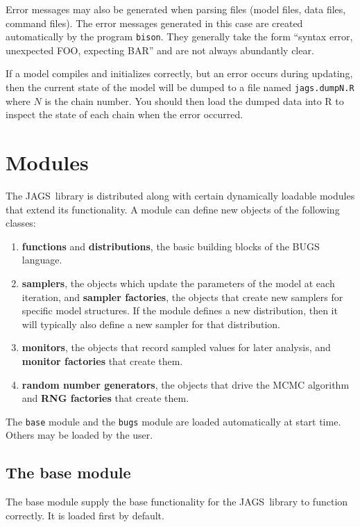 \documentclass[11pt, a4paper, titlepage]{report}
\newcommand{\JAGS}{\textsf{JAGS}}
\begin{document}
Error messages may also be generated when parsing files (model files,
data files, command files).  The error messages generated in this case
are created automatically by the program \texttt{bison}. They
generally take the form ``syntax error, unexpected FOO, expecting BAR''
and are not always abundantly clear.

If a model compiles and initializes correctly, but an error occurs
during updating, then the current state of the model will be dumped
to a file named \verb+jags.dumpN.R+ where $N$ is the chain number.
You should then load the dumped data into R to inspect the state of
each chain when the error occurred.

\chapter{Modules}
\label{section:modules}

The \JAGS\  library is distributed along with certain dynamically
loadable modules that extend its functionality. A module can define
new objects of the following classes:
\begin{enumerate}
\item {\bf functions} and {\bf distributions}, the basic building
blocks of the BUGS language.
\item {\bf samplers}, the objects which update the parameters of the
model at each iteration, and {\bf sampler factories}, the objects that 
create new samplers for specific model structures.  If the module
defines a new distribution, then it will typically also define a new
sampler for that distribution.
\item {\bf monitors}, the objects that record sampled values for
later analysis, and {\bf monitor factories} that create them. 
\item {\bf random number generators}, the objects that drive the
MCMC algorithm and {\bf RNG factories} that create them.
\end{enumerate}

The \verb+base+ module and the \verb+bugs+ module are loaded automatically
at start time.  Others may be loaded by the user.

\section{The base module}

The base module supply the base functionality for the \JAGS\ library
to function correctly. It is loaded first by default.  
\end{document}
